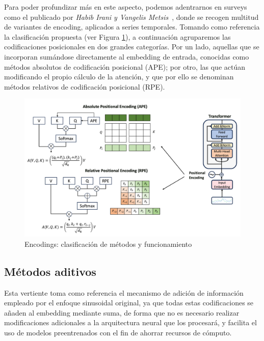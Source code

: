Para poder profundizar más en este aspecto, podemos adentrarnos en surveys como el publicado por \textit{Habib Irani y Vangelis Metsis}~\cite{irani2025positionalencodingtransformerbasedtime}, donde se recogen multitud de variantes de encoding, aplicados a series temporales. Tomando como referencia la clasificación propuesta (ver Figura \ref{encodings}), a continuación agruparemos las codificaciones posicionales en dos grandes categorías. Por un lado, aquellas que se incorporan sumándose directamente al embedding de entrada, conocidas como métodos absolutos de codificación posicional (APE); por otro, las que actúan modificando el propio cálculo de la atención, y que por ello se denominan métodos relativos de codificación posicional (RPE).


\begin{figure}[!ht]
	\centering
	\includegraphics[scale=0.275]{img/encodings.png}
	\caption{Encodings: clasificación de métodos y funcionamiento \cite{irani2025positionalencodingtransformerbasedtime}}
	\label{encodings}
\end{figure}

\subsection{Métodos aditivos}

Esta vertiente toma como referencia el mecanismo de adición de información empleado por el enfoque sinusoidal original, ya que todas estas codificaciones se añaden al embedding mediante suma, de forma que no es necesario realizar modificaciones adicionales a la arquitectura neural que los procesará, y facilita el uso de modelos preentrenados con el fin de ahorrar recursos de cómputo.\\

